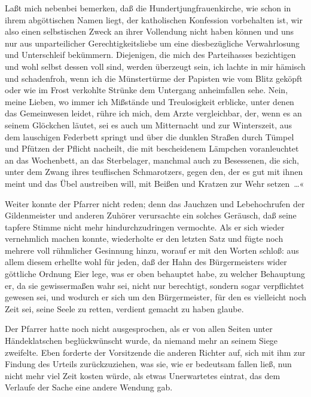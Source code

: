 Laßt mich nebenbei bemerken, daß die Hundertjungfrauenkirche, wie
\pagenum{[36]} schon in ihrem abgöttischen Namen liegt, der
katholischen Konfession vorbehalten ist, wir also einen
selbstischen Zweck an ihrer Vollendung nicht haben können und uns
nur aus unparteilicher Gerechtigkeitsliebe um eine diesbezügliche
Verwahrlosung und Unterschleif bekümmern. Diejenigen, die mich des
Parteihasses bezichtigen und wohl selbst dessen voll sind, werden
überzeugt sein, ich lachte in mir hämisch und schadenfroh, wenn ich
die Münstertürme der Papisten wie vom Blitz geköpft oder wie im
Frost verkohlte Strünke dem Untergang anheimfallen sehe. Nein,
meine Lieben, wo immer ich Mißstände und Treulosigkeit erblicke,
unter denen das Gemeinwesen leidet, rühre ich mich, dem Arzte
vergleichbar, der, wenn es an seinem Glöckchen läutet, sei es auch
um Mitternacht und zur Winterszeit, aus dem lauschigen Federbett
springt und über die dunklen Straßen durch Tümpel und Pfützen der
Pflicht nacheilt, die mit bescheidenem Lämpchen voranleuchtet an
das Wochenbett, an das Sterbelager, manchmal auch zu Besessenen,
die sich, unter dem Zwang ihres teuflischen Schmarotzers, gegen
den, der es gut mit ihnen meint und das Übel austreiben will, mit
Beißen und Kratzen zur Wehr setzen~…«

Weiter konnte der Pfarrer nicht reden; denn das Jauchzen und
Lebehochrufen der Gildenmeister und anderen Zuhörer verursachte ein
solches Geräusch, daß seine tapfere Stimme nicht mehr
hindurchzudringen vermochte. Als er sich wieder vernehmlich machen
konnte, wiederholte er den letzten Satz und fügte noch mehrere voll
rühmlicher Gesinnung hinzu, worauf er mit den Worten schloß: aus
allem diesem erhellte wohl für jeden, daß der Hahn des
Bürgermeisters wider göttliche Ordnung Eier lege, was er oben
behauptet habe, zu welcher Behauptung er, da sie gewissermaßen
\pagenum{[37]} wahr sei, nicht nur berechtigt, sondern sogar
verpflichtet gewesen sei, und wodurch er sich um den Bürgermeister,
für den es vielleicht noch Zeit sei, seine Seele zu retten,
verdient gemacht zu haben glaube.

Der Pfarrer hatte noch nicht ausgesprochen, als er von allen Seiten
unter Händeklatschen beglückwünscht wurde, da niemand mehr an
seinem Siege zweifelte. Eben forderte der Vorsitzende die anderen
Richter auf, sich mit ihm zur Findung des Urteils zurückzuziehen,
was sie, wie er bedeutsam fallen ließ, nun nicht mehr viel Zeit
kosten würde, als etwas Unerwartetes eintrat, das dem Verlaufe der
Sache eine andere Wendung gab.

